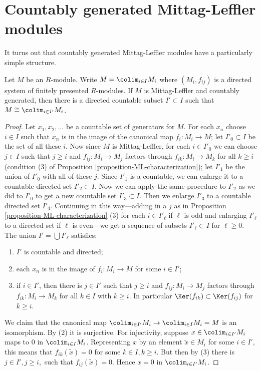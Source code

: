 \section{Countably generated Mittag-Leffler modules}
\label{section-ML-countable}

\noindent
It turns out that countably generated Mittag-Leffler modules have a
particularly simple structure.

\begin{lemma}
\label{lemma-ML-countable-colimit}
Let $M$ be an $R$-module.  Write $M = \colim_{i \in I} M_i$ where $(M_i,
f_{ij})$ is a directed system of finitely presented $R$-modules.  If $M$ is
Mittag-Leffler and countably generated, then there is a directed countable
subset $I' \subset I$ such that $M \cong \colim_{i \in I'} M_i$.
\end{lemma}

\begin{proof}
Let $x_1, x_2, \ldots$ be a countable set of generators for $M$.  For each $x_n$
choose $i \in I$ such that $x_n$ is in the image of the canonical map $f_i:
M_i \to M$; let $I'_{0} \subset I$ be the set of all these $i$.  Now
since $M$ is Mittag-Leffler, for each $i \in I'_{0}$ we can choose $j \in I$
such that $j \geq i$ and $f_{ij}: M_i \to M_j$ factors through
$f_{ik}: M_i \to M_k$ for all $k \geq i$  (condition (3) of Proposition
\ref{proposition-ML-characterization}); let $I'_1$ be the union of $I'_0$ with
all of these $j$.  Since $I'_1$ is a countable, we can enlarge it to a
countable directed set $I'_{2} \subset I$.  Now we can apply the same procedure
to $I'_{2}$ as we did to $I'_{0}$ to get a new countable set $I'_{3} \subset
I$.  Then we enlarge $I'_{3}$ to a countable directed set $I'_{4}$.  Continuing
in this way---adding in a $j$ as in Proposition
\ref{proposition-ML-characterization} (3) for each $ i \in I'_{\ell}$ if $\ell$
is odd and enlarging $I'_{\ell}$ to a directed set if $\ell$ is even---we get a
sequence of subsets $I'_{\ell} \subset I$ for $\ell \geq 0$.  The union $I' =
\bigcup I'_{\ell}$ satisfies:
\begin{enumerate}
\item $I'$ is countable and directed;
\item each $x_n$ is in the image of $f_i: M_i \to M$ for some $i
\in I'$;
\item if $i \in I'$, then there is $j \in I'$ such that $j \geq i$ and $f_{ij}:
M_i \to M_j$ factors through $f_{ik}: M_i \to M_k$ for all
$k \in I$ with $k \geq i$.  In particular $\Ker(f_{ik}) \subset \Ker(f_{ij})$
for $k \geq i$.
\end{enumerate}
We claim that the canonical map $\colim_{i \in I'} M_i \to
\colim_{i
\in I} M_i = M$ is an isomorphism.  By (2) it is surjective.  For injectivity,
suppose $x \in \colim_{i \in I'} M_i$ maps to $0$ in $\colim_{i \in
I} M_i$.
Representing $x$ by an element $\tilde{x} \in M_i$ for some $i \in I'$, this
means that $f_{ik}(\tilde{x}) = 0$ for some $k \in I, k \geq i$.  But then by
(3) there is $j \in I', j \geq i,$ such that $f_{ij}(\tilde{x}) = 0$.  Hence $x
= 0$ in $\colim_{i \in I'} M_i$.
\end{proof}

